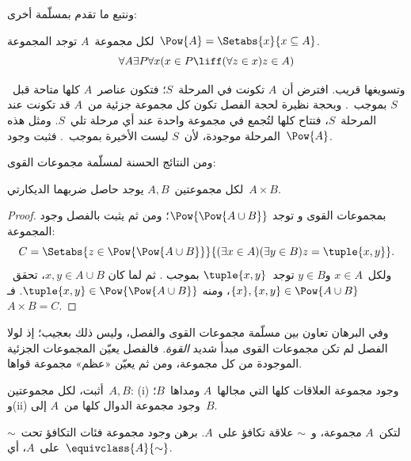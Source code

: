 \documentclass[../../../include/open-logic-section]{subfiles}
\begin{document}

ونتبع ما تقدم بمسلّمة أخرى:

\begin{axiom}
لكل مجموعة~$A$ توجد المجموعة~$\Pow{A} = \Setabs{x}{x \subseteq A}$.
\[
	\forall A \exists P \forall x(x \in P \liff (\forall z \in x)z \in A)
\]
\end{axiom}

وتسويغها قريب. افترض أن~$A$ تكونت في المرحلة~$S$؛ فتكون عناصر~$A$
كلها متاحة قبل~$S$ بموجب~\stagesacc. وبحجة نظيرة لحجة الفصل تكون كل
مجموعة جزئية من~$A$ قد تكونت عند المرحلة~$S$، فتتاح كلها لتُجمع في
مجموعة واحدة عند أي مرحلة تلي~$S$. ومثل هذه المرحلة موجودة، لأن~$S$
ليست الأخيرة بموجب~\stagessucc. فثبت وجود~$\Pow{A}$.

ومن النتائج الحسنة لمسلّمة مجموعات القوى:

\begin{prop}\label{thm:Products}
لكل مجموعتين~$A,B$ يوجد حاصل ضربهما الديكارتي~$A \times B$.
\end{prop}

\begin{proof}
بمجموعات القوى و توجد
$\Pow{\Pow{A \cup B}}$؛ ومن ثم يثبت بالفصل وجود المجموعة:
\[
	C = \Setabs{z \in \Pow{\Pow{A \cup B}}}{(\exists x \in A)(\exists y \in B) z = \tuple{x, y}}.
\]
ولكل~$x \in A$ و$y \in B$ توجد~$\tuple{x,y}$ بموجب
. ثم لما كان
$x,y \in A \cup B$، تحقق~$\{x\},\{x,y\} \in \Pow{A \cup B}$، ومنه
$\tuple{x,y} \in \Pow{\Pow{A \cup B}}$. فـ~$A \times B = C$.
\end{proof}

وفي البرهان تعاون بين مسلّمة مجموعات القوى والفصل، وليس ذلك بعجيب؛ إذ
لولا الفصل لم تكن مجموعات القوى مبدأ شديد \emph{القوة}. فالفصل يعيّن
المجموعات الجزئية الموجودة من كل مجموعة، ومن ثم يعيّن «عظم» مجموعة
قواها.

\begin{prob}
أثبت، لكل مجموعتين~$A,B$: (i) وجود مجموعة العلاقات كلها التي مجالها~$A$
ومداها~$B$؛ و(ii) وجود مجموعة الدوال كلها من~$A$ إلى~$B$.
\end{prob}

\begin{prob}
لتكن~$A$ مجموعة، و~$\sim$ علاقة تكافؤ على~$A$. برهن وجود مجموعة فئات
التكافؤ تحت~$\sim$ على~$A$، أي~$\equivclass{A}{\sim}$.
\end{prob}
\end{document}
